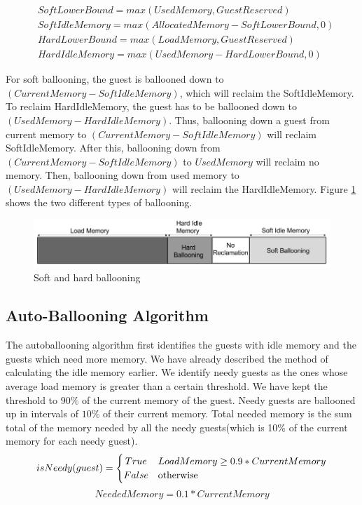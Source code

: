 \begin{align*}
&SoftLowerBound = max(Used Memory, Guest Reserved)\\
&Soft Idle Memory = max(Allocated Memory - SoftLowerBound, 0)\\
&Hard Lower Bound = max(Load Memory, Guest Reserved)\\
&Hard Idle Memory = max(Used Memory - Hard Lower Bound, 0)
\end{align*}

For soft ballooning, the guest is ballooned down to $(Current Memory - Soft Idle Memory)$, which will reclaim the SoftIdleMemory. To reclaim HardIdleMemory, the guest has to be ballooned down to $(Used Memory - Hard Idle Memory)$. Thus, ballooning down a guest from current memory to $(Current Memory - Soft Idle Memory)$ will reclaim SoftIdleMemory. After this, ballooning down from  $(Current Memory - Soft Idle Memory)$ to $Used Memory$ will reclaim no memory. Then, ballooning down from used memory to $(Used Memory - Hard Idle Memory)$ will reclaim the HardIdleMemory. Figure \ref{fig:mem2} shows the two different types of ballooning.

\begin{figure}[hb]
  \centering
  \includegraphics[width=\textwidth]{mem2.png}
  \caption{Soft and hard ballooning}\label{fig:mem2}
\end{figure}

\subsection{Auto-Ballooning Algorithm}
The autoballooning algorithm first identifies the guests with idle memory and the guests which need more memory. We have already described the method of calculating the idle memory earlier. We identify needy guests as the ones whose average load memory is greater than a certain threshold. We have kept the threshold to $90\%$ of the current memory of the guest. Needy guests are ballooned up in intervals of $10\%$ of their current memory. Total needed memory is the sum total of the memory needed by all the needy guests(which is 10\% of the current memory for each needy guest).
\[
isNeedy(guest) =
  \begin{cases}
  	  \hfill True \hfill &  \text{$LoadMemory \ge 0.9*CurrentMemory$}\\
      \hfill False \hfill & \text{otherwise} \\
  \end{cases}
\]
$$ NeededMemory = 0.1*CurrentMemory$$

